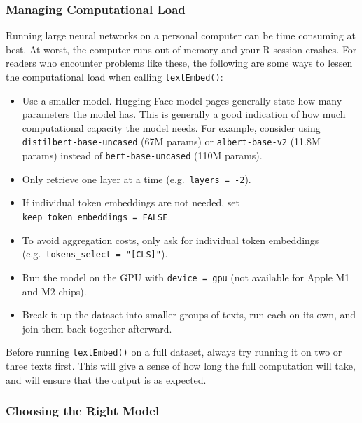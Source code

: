 \documentclass[
  man,
  floatsintext,
  longtable,
  nolmodern,
  notxfonts,
  notimes,
  colorlinks=true,linkcolor=blue,citecolor=blue,urlcolor=blue]{apa7}
\providecommand{\tightlist}{%
  \setlength{\itemsep}{0pt}\setlength{\parskip}{0pt}}
\begin{document}
\subsubsection{Managing Computational
Load}\label{managing-computational-load}

Running large neural networks on a personal computer can be time
consuming at best. At worst, the computer runs out of memory and your R
session crashes. For readers who encounter problems like these, the
following are some ways to lessen the computational load when calling
\texttt{textEmbed()}:

\begin{itemize}
\tightlist
\item
  Use a smaller model. Hugging Face model pages generally state how many
  parameters the model has. This is generally a good indication of how
  much computational capacity the model needs. For example, consider
  using \texttt{distilbert-base-uncased} (67M params) or
  \texttt{albert-base-v2} (11.8M params) instead of
  \texttt{bert-base-uncased} (110M params).
\item
  Only retrieve one layer at a time (e.g.~\texttt{layers\ =\ -2}).
\item
  If individual token embeddings are not needed, set
  \texttt{keep\_token\_embeddings\ =\ FALSE}.
\item
  To avoid aggregation costs, only ask for individual token embeddings
  (e.g.~\texttt{tokens\_select\ =\ "{[}CLS{]}"}).
\item
  Run the model on the GPU with
  \texttt{device\ =\ \textquotesingle{}gpu\textquotesingle{}} (not
  available for Apple M1 and M2 chips).
\item
  Break it up the dataset into smaller groups of texts, run each on its
  own, and join them back together afterward.
\end{itemize}

Before running \texttt{textEmbed()} on a full dataset, always try
running it on two or three texts first. This will give a sense of how
long the full computation will take, and will ensure that the output is
as expected.

\subsubsection{Choosing the Right Model}\label{choosing-the-right-model}
\end{document}
